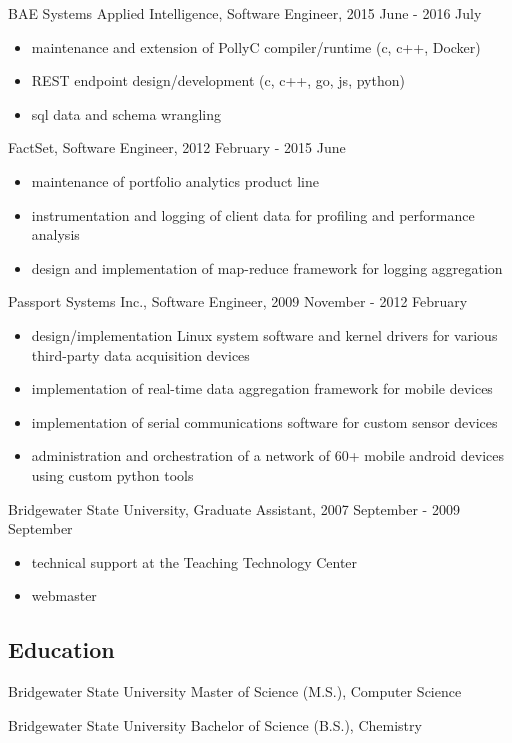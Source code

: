\documentclass[letterpaper,10pt]{article}
\begin{document}
BAE Systems Applied Intelligence, Software Engineer, 2015 June - 2016 July

\begin{itemize}
\itemsep0em
\item maintenance and extension of PollyC compiler/runtime (c, c++, Docker)
\item REST endpoint design/development (c, c++, go, js, python)
\item sql data and schema wrangling
\end{itemize}

FactSet, Software Engineer, 2012 February - 2015 June

\begin{itemize}
\itemsep0em
\item maintenance of portfolio analytics product line
\item instrumentation and logging of client data for profiling and performance analysis
\item design and implementation of map-reduce framework for logging aggregation
\end{itemize}

Passport Systems Inc., Software Engineer, 2009 November - 2012 February

\begin{itemize}
\itemsep0em
\item design/implementation Linux system software and kernel drivers for various
third-party data acquisition devices
\item implementation of real-time data aggregation framework for mobile devices
\item implementation of serial communications software for custom sensor devices
\item administration and orchestration of a network of 60+ mobile android devices using custom python tools
\end{itemize}

Bridgewater State University, Graduate Assistant, 2007 September - 2009 September

\begin{itemize}
\itemsep0em
\item technical support at the Teaching Technology Center
\item webmaster
\end{itemize}

\subsection*{Education}

Bridgewater State University
Master of Science (M.S.), Computer Science

Bridgewater State University
Bachelor of Science (B.S.), Chemistry
\end{document}
